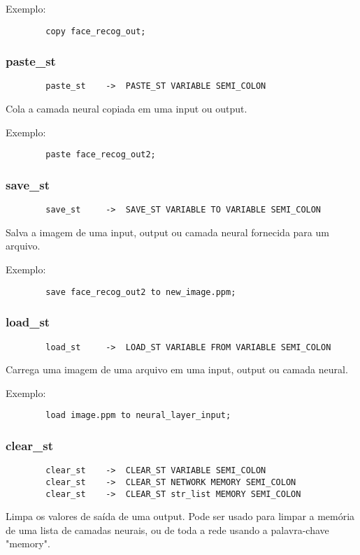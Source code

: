 \documentclass[a4paper,10pt]{article}
\begin{document}
		Exemplo:
		\begin{lstlisting}
		copy face_recog_out;
		\end{lstlisting}
		\vspace{10mm}
	\subsubsection{paste\_st}
		\begin{lstlisting}
		paste_st	->	PASTE_ST VARIABLE SEMI_COLON
		\end{lstlisting}
		Cola a camada neural copiada em uma input ou output.
		
		Exemplo:
		\begin{lstlisting}
		paste face_recog_out2;
		\end{lstlisting}
		\vspace{10mm}
	\subsubsection{save\_st}
		\begin{lstlisting}
		save_st		->	SAVE_ST VARIABLE TO VARIABLE SEMI_COLON
		\end{lstlisting}
		Salva a imagem de uma input, output ou camada neural fornecida para um arquivo.
		
		Exemplo:
		\begin{lstlisting}
		save face_recog_out2 to new_image.ppm;
		\end{lstlisting}
		\vspace{10mm}
	\subsubsection{load\_st}
		\begin{lstlisting}
		load_st		->	LOAD_ST VARIABLE FROM VARIABLE SEMI_COLON
		\end{lstlisting}
		Carrega uma imagem de uma arquivo em uma input, output ou camada neural.
		
		Exemplo:
		\begin{lstlisting}
		load image.ppm to neural_layer_input;
		\end{lstlisting}
		\vspace{10mm}
	\subsubsection{clear\_st}
		\begin{lstlisting}
		clear_st	->	CLEAR_ST VARIABLE SEMI_COLON
		clear_st	->	CLEAR_ST NETWORK MEMORY SEMI_COLON
		clear_st	->	CLEAR_ST str_list MEMORY SEMI_COLON
		\end{lstlisting}
		Limpa os valores de sa\'ida  de uma output. Pode ser usado para limpar a mem\'oria de uma lista de camadas neurais, ou de toda a rede usando a palavra-chave "memory".
		
\end{document}
